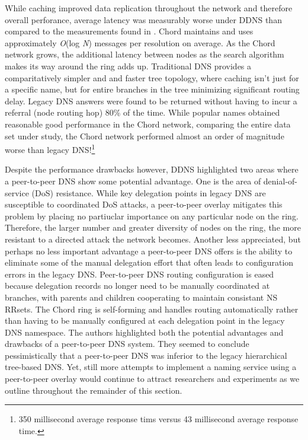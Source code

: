 \documentclass[sigconf]{acmart}
\begin{document}
While caching improved data replication throughout the network and
therefore overall perforance, average latency was measurably worse under
DDNS than compared to the measurements found in \cite{jung_dns_2002}.
Chord maintains and uses approximately \emph{O}(log \emph{N}) messages
per resolution on average.  As the Chord network grows, the additional
latency between nodes as the search algorithm makes its way around the
ring adds up.  Traditional DNS provides a comparitatively simpler and
and faster tree topology, where caching isn't just for a specific name,
but for entire branches in the tree minimizing significant routing
delay.  Legacy DNS answers were found to be returned without having to
incur a referral (node routing hop) 80\% of the time.  While popular
names obtained reasonable good performance in the Chord network,
comparing the entire data set under study, the Chord network performed
almost an order of magnitude worse than legacy DNS!\footnote{350
millisecond average response tims versus 43 millisecond average response
time.}

Despite the performance drawbacks however, DDNS highlighted two areas
where a peer-to-peer DNS show some potential advantage.  One is the area
of denial-of-service (DoS) resistance.  While key delegation points in
legacy DNS are susceptible to coordinated DoS attacks, a peer-to-peer
overlay mitigates this problem by placing no partiuclar importance on
any particular node on the ring.  Therefore, the larger number and
greater diversity of nodes on the ring, the more resistant to a directed
attack the network becomes.  Another less appreciated, but perhaps no
less important advantage a peer-to-peer DNS offers is the ability to
eliminate some of the manual delegation effort that often leads to
configuration errors in the legacy DNS.  Peer-to-peer DNS routing
configuration is eased because delegation records no longer need to be
manually coordinated at branches, with parents and children cooperating
to maintain consistant NS RRsets.  The Chord ring is self-forming and
handles routing automatically rather than having to be manually
configured at each delegation point in the legacy DNS namespace.  The
authors highlighted both the potential advantages and drawbacks of a
peer-to-peer DNS system.  They seemed to conclude pessimistically that a
peer-to-peer DNS was inferior to the legacy hierarchical tree-based DNS.
Yet, still more attempts to implement a naming service using a
peer-to-peer overlay would continue to attract researchers and
experiments as we outline throughout the remainder of this section.
\end{document}
